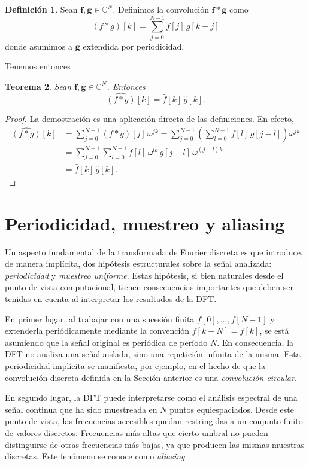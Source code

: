 \documentclass[12pt, a4paper]{amsbook}
\newcommand{\C}{{\mathbb C}}
\newcommand{\ff}{{\mathbf f}}
\newcommand{\gb}{{\mathbf g}}
\newtheorem{teo}{Teorema}[section]
\theoremstyle{remark}
\theoremstyle{definition}
\newtheorem{defi}[teo]{Definición}
\numberwithin{section}{chapter}
\numberwithin{subsection}{section}
\numberwithin{equation}{section}
\numberwithin{figure}{chapter}
\begin{document}
\begin{defi}
Sean $\ff, \gb\in\C^N$. Definimos la convolución $\ff*\gb$ como
$$
(f*g)[k] = \sum_{j=0}^{N-1} f[j]\, g[k-j]
$$
donde asumimos a $\gb$ extendida por periodicidad.
\end{defi}

Tenemos entonces
\begin{teo}
Sean $\ff, \gb\in\C^N$. Entonces
$$
\widehat{(f*g)}[k] = \hat f[k]\, \hat g[k].
$$
\end{teo}

\begin{proof}
La demostración es una aplicación directa de las definiciones. En efecto,
\begin{align*}
\widehat{(f*g)}[k] &= \sum_{j=0}^{N-1} (f*g)[j]\, \omega^{jk} = \sum_{j=0}^{N-1}\left(\sum_{l=0}^{N-1} f[l]\, g[j-l]\right) \omega^{jk}\\ 
&= \sum_{j=0}^{N-1} \sum_{l=0}^{N-1} f[l]\, \omega^{lk}\, g[j-l]\, \omega^{(j-l)k}\\
&= \hat f[k]\, \hat g[k].
\end{align*}
\end{proof}

\section{Periodicidad, muestreo y aliasing}

Un aspecto fundamental de la transformada de Fourier discreta es que introduce, de manera implícita, dos hipótesis estructurales sobre la señal analizada: \emph{periodicidad} y \emph{muestreo uniforme}. Estas hipótesis, si bien naturales desde el punto de vista computacional, tienen consecuencias importantes que deben ser tenidas en cuenta al interpretar los resultados de la DFT.

En primer lugar, al trabajar con una sucesión finita $f[0],\dots,f[N-1]$ y extenderla periódicamente mediante la convención $f[k+N]=f[k]$, se está asumiendo que la señal original es periódica de período $N$. En consecuencia, la DFT no analiza una señal aislada, sino una repetición infinita de la misma. Esta periodicidad implícita se
manifiesta, por ejemplo, en el hecho de que la convolución discreta definida en la Sección anterior es una \emph{convolución circular}.

En segundo lugar, la DFT puede interpretarse como el análisis espectral de una señal continua que ha sido muestreada en $N$ puntos equiespaciados. Desde este punto de vista, las frecuencias accesibles quedan restringidas a un conjunto finito de valores discretos. Frecuencias más altas que cierto umbral no pueden distinguirse de otras frecuencias más bajas, ya que producen las mismas muestras discretas. Este fenómeno se conoce como \emph{aliasing}.
\end{document}
